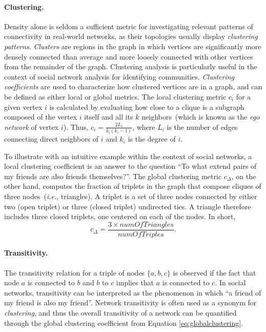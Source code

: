 \paragraph*{Clustering.}
Density alone is seldom a sufficient metric for investigating relevant patterns of connectivity in real-world networks, as their topologies usually display \textit{clustering patterns}.
\textit{Clusters} are regions in the graph in which vertices are significantly more densely connected than average and more loosely connected with other vertices from the remainder of the graph. 
Clustering analysis is particularly useful in the context of social network analysis for identifying communities.
%
\textit{Clustering coefficients} are used to characterize how clustered vertices are in a graph, and can be defined as either local or global metrics.
The local clustering metric $c_i$ for a given vertex $i$ is calculated by evaluating how close to a clique is a subgraph composed of the vertex $i$ itself and all its $k$ neighbors~(which is known as the \textit{ego network} of vertex $i$). Thus, $c_i = \frac{2L_i}{k_i(k_i - 1)}$, where $L_i$ is the number of edges connecting direct neighbors of $i$ and $k_i$ is the degree of $i$.

To illustrate with an intuitive example within the context of social networks, a local clustering coefficient is an answer to the question ``To what extend pairs of my friends are also friends themselves?''.
%
The global clustering metric $c_{\Delta}$, on the other hand, computes the fraction of triplets in the graph that compose cliques of three nodes~(\textit{i.e.}, triangles). A triplet is a set of three nodes connected by either two (open triplet) or three (closed triplet) undirected ties. A triangle therefore includes three closed triplets, one centered on each of the nodes. In short, \begin{equation}\label{eq:globalclustering}
c_{\Delta} = \frac{3 \times numOfTriangles}{numOfTriples}.
\end{equation}


\paragraph*{Transitivity.}
The transitivity relation for a triple of nodes $\{a,b,c\}$ is observed if the fact that node $a$ is connected to $b$ and $b$ to $c$ implies that $a$ is connected to $c$.
In social networks, transitivity can be interpreted as the phenomenon in which ``a friend of my friend is also my friend''.
Network transitivity is often used as a synonym for \textit{clustering}, and thus the overall transitivity of a network can be quantified through the global clustering coefficient from Equation \ref{eq:globalclustering}.

